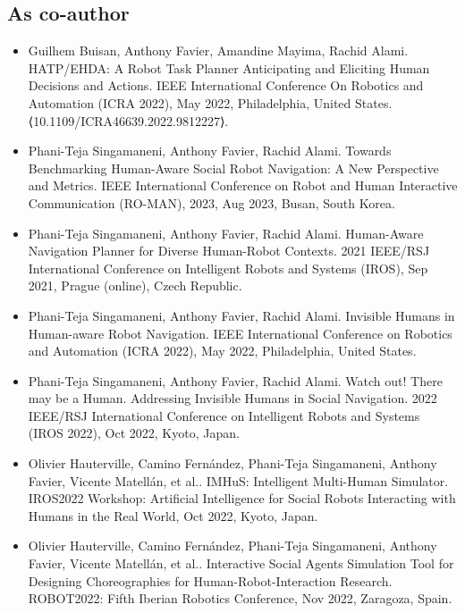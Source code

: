 \subsection*{As co-author}
\begin{itemize}
    
    \item Guilhem Buisan, Anthony Favier, Amandine Mayima, Rachid Alami. HATP/EHDA: A Robot Task Planner Anticipating and Eliciting Human Decisions and Actions. IEEE International Conference On Robotics and Automation (ICRA 2022), May 2022, Philadelphia, United States. ⟨10.1109/ICRA46639.2022.9812227⟩. 
    
    \item Phani-Teja Singamaneni, Anthony Favier, Rachid Alami. Towards Benchmarking Human-Aware Social Robot Navigation: A New Perspective and Metrics. IEEE International Conference on Robot and Human Interactive Communication (RO-MAN), 2023, Aug 2023, Busan, South Korea.
    \item Phani-Teja Singamaneni, Anthony Favier, Rachid Alami. Human-Aware Navigation Planner for Diverse Human-Robot Contexts. 2021 IEEE/RSJ International Conference on Intelligent Robots and Systems (IROS), Sep 2021, Prague (online), Czech Republic. 
    \item Phani-Teja Singamaneni, Anthony Favier, Rachid Alami. Invisible Humans in Human-aware Robot Navigation. IEEE International Conference on Robotics and Automation (ICRA 2022), May 2022, Philadelphia, United States.
    \item Phani-Teja Singamaneni, Anthony Favier, Rachid Alami. Watch out! There may be a Human. Addressing Invisible Humans in Social Navigation. 2022 IEEE/RSJ International Conference on Intelligent Robots and Systems (IROS 2022), Oct 2022, Kyoto, Japan. 

    \item Olivier Hauterville, Camino Fernández, Phani-Teja Singamaneni, Anthony Favier, Vicente Matellán, et al.. IMHuS: Intelligent Multi-Human Simulator. IROS2022 Workshop: Artificial Intelligence for Social Robots Interacting with Humans in the Real World, Oct 2022, Kyoto, Japan. 
    \item Olivier Hauterville, Camino Fernández, Phani-Teja Singamaneni, Anthony Favier, Vicente Matellán, et al.. Interactive Social Agents Simulation Tool for Designing Choreographies for Human-Robot-Interaction Research. ROBOT2022: Fifth Iberian Robotics Conference, Nov 2022, Zaragoza, Spain. 
\end{itemize}
    
    
    